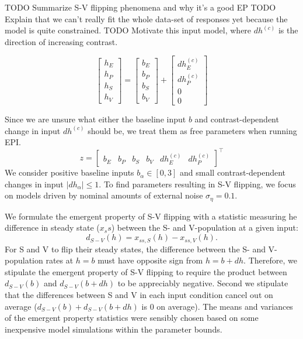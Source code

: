 \documentclass[11pt]{article}
\begin{document}
TODO Summarize S-V flipping phenomena and why it's a good EP
TODO Explain that we can't really fit the whole data-set of responses yet because the model is quite constrained.
TODO Motivate this input model, where $dh^{(c)}$ is the direction of increasing contrast.

\begin{equation}
 \begin{bmatrix} h_E \\ h_P \\ h_S \\ h_V \end{bmatrix} =  \begin{bmatrix} b_E \\ b_P \\ b_S \\ b_V \end{bmatrix} +  \begin{bmatrix} dh^{(c)}_E \\ dh^{(c)}_P \\ 0 \\ 0 \end{bmatrix} 
\end{equation}

Since we are unsure what either the baseline input $b$ and contrast-dependent change in input $dh^{(c)}$ should be, we treat them as free parameters when running EPI.
\begin{equation}
 z =  \begin{bmatrix} b_E & b_P & b_S & b_V & dh^{(c)}_E & dh^{(c)}_P \end{bmatrix}^\top
\end{equation}
We consider positive baseline inputs $b_\alpha \in \left[0, 3 \right]$ and small contrast-dependent changes in input $|dh_\alpha| \leq 1$.  
To find parameters resulting in S-V flipping, we focus on models driven by nominal amounts of external noise $\sigma_{\eta} = 0.1$. 

We formulate the emergent property of S-V flipping with a statistic measuring he difference in steady state ($x_ss$) between the S- and V-population at a given input:
\begin{equation}
d_{S-V}(h) = x_{ss,S}(h) - x_{ss,V}(h).
\end{equation}
For S and V to flip their steady states, the difference between the S- and V-population rates at $h = b$ must have opposite sign from $h = b + dh$.  Therefore, we stipulate the emergent property of S-V flipping to require the product between $d_{S-V}(b)$ and $d_{S-V}(b+dh)$ to be appreciably negative.  Second we stipulate that the differences between S and V in each input condition cancel out on average ($d_{S-V}(b) + d_{S-V}(b+dh)$ is 0 on average).  The means and variances of the emergent property statistics were sensibly chosen based on some inexpensive model simulations within the parameter bounds.
\end{document}

